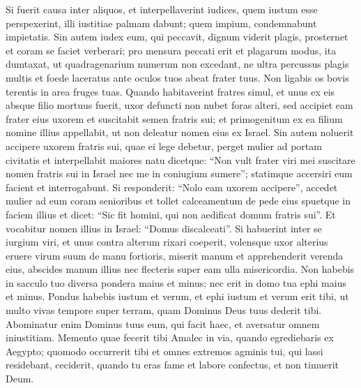 \begin{biblechapter}
\begin{biblechapter}
\begin{biblechapter}
\begin{biblechapter}
\begin{biblechapter}
\begin{biblechapter}
\begin{biblechapter}
\begin{biblechapter}
\begin{biblechapter}
\begin{biblechapter}
\begin{biblechapter}
\begin{biblechapter}
\begin{biblechapter}
\begin{biblechapter}
\begin{biblechapter}
\begin{biblechapter}
\begin{biblechapter}
\begin{biblechapter}
\begin{biblechapter}
\begin{biblechapter}
\begin{biblechapter}
\begin{biblechapter}
\begin{biblechapter}
\begin{biblechapter}
\begin{biblechapter}
\verse Si fuerit causa inter aliquos, et interpellaverint iudices, quem iustum esse perspexerint, illi iustitiae palmam dabunt; quem impium, condemnabunt impietatis. 
\verse Sin autem iudex eum, qui peccavit, dignum viderit plagis, prosternet et coram se faciet verberari; pro mensura peccati erit et plagarum modus, 
\verse ita dumtaxat, ut quadragenarium numerum non excedant, ne ultra percussus plagis multis et foede laceratus ante oculos tuos abeat frater tuus.
 \verse Non ligabis os bovis terentis in area fruges tuas.
 \verse Quando habitaverint fratres simul, et unus ex eis absque filio mortuus fuerit, uxor defuncti non nubet foras alteri, sed accipiet eam frater eius uxorem et suscitabit semen fratris sui; 
\verse et primogenitum ex ea filium nomine illius appellabit, ut non deleatur nomen eius ex Israel. 
\verse Sin autem noluerit accipere uxorem fratris sui, quae ei lege debetur, perget mulier ad portam civitatis et interpellabit maiores natu dicetque: “Non vult frater viri mei suscitare nomen fratris sui in Israel nec me in coniugium sumere”; 
\verse statimque accersiri eum facient et interrogabunt. Si responderit: “Nolo eam uxorem accipere”, 
\verse accedet mulier ad eum coram senioribus et tollet calceamentum de pede eius spuetque in faciem illius et dicet: “Sic fit homini, qui non aedificat domum fratris sui”. 
\verse Et vocabitur nomen illius in Israel: “Domus discalceati”.
 \verse Si habuerint inter se iurgium viri, et unus contra alterum rixari coeperit, volensque uxor alterius eruere virum suum de manu fortioris, miserit manum et apprehenderit verenda eius, 
\verse abscides manum illius nec flecteris super eam ulla misericordia.
 \verse Non habebis in sacculo tuo diversa pondera maius et minus; 
\verse nec erit in domo tua ephi maius et minus. 
\verse Pondus habebis iustum et verum, et ephi iustum et verum erit tibi, ut multo vivas tempore super terram, quam Dominus Deus tuus dederit tibi. 
\verse Abominatur enim Dominus tuus eum, qui facit haec, et aversatur omnem iniustitiam.
 \verse Memento quae fecerit tibi Amalec in via, quando egrediebaris ex Aegypto; 
 \verse quomodo occurrerit tibi et omnes extremos agminis tui, qui lassi residebant, ceciderit, quando tu eras fame et labore confectus, et non timuerit Deum. 

\end{biblechapter}
\end{biblechapter}
\end{biblechapter}
\end{biblechapter}
\end{biblechapter}
\end{biblechapter}
\end{biblechapter}
\end{biblechapter}
\end{biblechapter}
\end{biblechapter}
\end{biblechapter}
\end{biblechapter}
\end{biblechapter}
\end{biblechapter}
\end{biblechapter}
\end{biblechapter}
\end{biblechapter}
\end{biblechapter}
\end{biblechapter}
\end{biblechapter}
\end{biblechapter}
\end{biblechapter}
\end{biblechapter}
\end{biblechapter}
\end{biblechapter}
